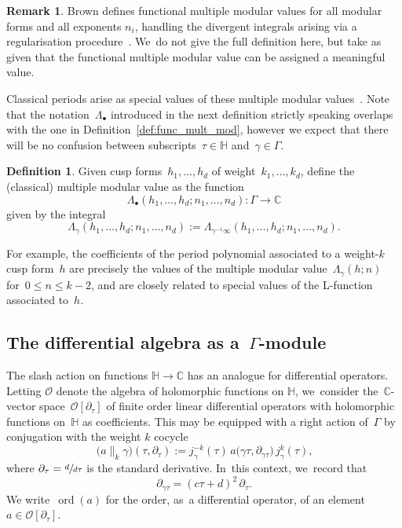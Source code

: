 \documentclass[JEP,XML,SOM,Unicode,published]{cedram}
\let\oldbullet\bullet
\renewcommand{\bullet}{{\scriptscriptstyle\oldbullet}}
\theoremstyle{plain}
\theoremstyle{definition}
\newtheorem{definition}[theoremcounter]{Definition}
\newtheorem{remark}[theoremcounter]{Remark}
\newcommand{\tx}{\text}
\newcommand{\nbd}{\nobreakdash-\hspace{0pt}}
\newcommand{\texpdf}[2]{\texorpdfstring{#1}{#2}}
\newcommand{\bbC}{\ensuremath{\mathbb{C}}}
\newcommand{\cO}{\ensuremath{\mathcal{O}}}
\newcommand{\defcol}{\mathrel{:}}
\newcommand{\defeq}{:=}
\newcommand{\HS}{\ensuremath{\mathbb{H}}}
\let\Ga\Gamma
\let\ga\gamma
\newcommand{\ord}{\operatorname{ord}}
\begin{document}
\begin{remark}
Brown defines functional multiple modular values for all modular forms and all exponents $n_i$, handling the divergent integrals arising via a regularisation procedure~\cite{brown17,brown19,matthes22}. We~do not give the full definition here, but take as given that the functional multiple modular value can be assigned a meaningful value.
\end{remark}

Classical periods arise as special values of these multiple modular values~\cite{brown17,brown19}. Note that the notation~$\Lambda_\bullet$ introduced in the next definition strictly speaking overlaps with the one in Definition~\ref{def:func_mult_mod}, however we expect that there will be no confusion between subscripts~$\tau \in \HS$ and~$\ga \in \Ga$.

\begin{definition}
\label{def:multi_modular_value}
Given cusp forms~$h_1,\ldots,h_d$ of weight~$k_1,\ldots,k_d$, define the (classical) multiple modular value as the function
\begin{equation*}
\Lambda_\bullet(h_1,\ldots,h_d;n_1,\ldots,n_d)
\defcol
\Ga \to \bbC
\end{equation*}
given by the integral
\begin{equation*}
\Lambda_\ga(h_1,\ldots,h_d;n_1,\ldots,n_d)
\defeq
\Lambda_{\ga^{-1}\infty}(h_1,\ldots,h_d;n_1,\ldots,n_d)
\tx{.}
\end{equation*}
\end{definition}

For example, the coefficients of the period polynomial associated to a weight\nbd{}$k$ cusp form~$h$ are precisely the values of the multiple modular value~$\Lambda_{\ga}(h;n)$ for~$0 \le n \le k-2$, and are closely related to special values of the L-function associated to~$h$.

\subsection{The differential algebra as a~\texpdf{$\Ga$}{Gamma}-module}
\label{ssec:preliminaries:differential_algebras}

The slash action on functions \hbox{$\HS \to \bbC$} has an analogue for differential operators. Letting $\cO$ denote the algebra of holomorphic functions on $\HS$, we~consider the~$\bbC$\nbd{}vector space~$\cO[\partial_\tau]$ of finite order linear differential operators with holomorphic functions on~$\HS$ as coefficients. This may be equipped with a right action of~$\Ga$ by conjugation with the weight $k$ cocycle
\begin{equation}
\label{eq:def:double_slash_action}
\bigl(a \big\|_k \ga \bigr) (\tau, \partial_\tau)
\defeq
j^{-k}_\ga(\tau)\,
a\bigl(\ga \tau, \partial_{\ga \tau} \bigr)\,
j^k_\ga(\tau)
\tx{,}
\end{equation}
where $\partial_\tau= \sfrac{d}{d\tau}$ is the standard derivative. In~this context, we~record that
\begin{equation*}
\partial_{\ga \tau}
=
(c \tau + d)^2\,
\partial_\tau
\tx{.}
\end{equation*}
We write~$\ord(a)$ for the order, as~a differential operator, of an element~$a\in\cO[\partial_\tau]$.
\end{document}
